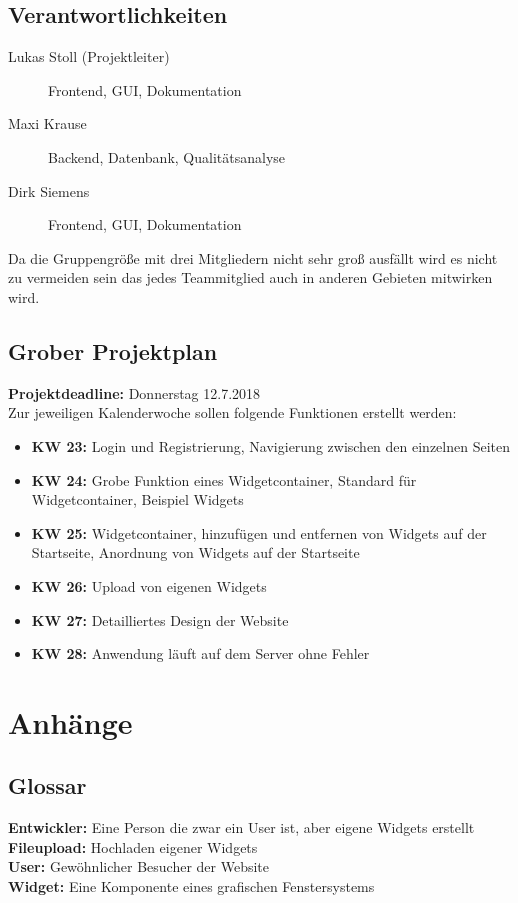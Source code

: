 	\subsection{Verantwortlichkeiten}
		\begin{description}
			\item[Lukas Stoll (Projektleiter)] Frontend, GUI, Dokumentation
			\item[Maxi Krause] Backend, Datenbank, Qualitätsanalyse
			\item[Dirk Siemens] Frontend, GUI, Dokumentation
		\end{description}
		Da die Gruppengröße mit drei Mitgliedern nicht sehr groß ausfällt wird es nicht zu vermeiden sein das jedes Teammitglied auch in anderen Gebieten mitwirken wird. 
	
	\label{meile}
	\subsection{Grober Projektplan}
		\textbf{Projektdeadline: } Donnerstag 12.7.2018 \\
		Zur jeweiligen Kalenderwoche sollen folgende Funktionen erstellt werden: 
		\begin{itemize}
			\item \textbf{KW 23: }Login und Registrierung, Navigierung zwischen den einzelnen Seiten 
			\item \textbf{KW 24: }Grobe Funktion eines Widgetcontainer, Standard für Widgetcontainer, Beispiel Widgets  
			\item \textbf{KW 25: }Widgetcontainer, hinzufügen und entfernen von Widgets auf der Startseite, Anordnung von Widgets auf der Startseite   
			\item \textbf{KW 26: }Upload von eigenen Widgets
			\item \textbf{KW 27: }Detailliertes Design der Website 
			\item \textbf{KW 28: }Anwendung läuft auf dem Server ohne Fehler
		\end{itemize}
		
		
	
\newpage
\section{Anhänge}

	\subsection{Glossar}
		\textbf{Entwickler:} Eine Person die zwar ein User ist, aber eigene Widgets erstellt\\
		\textbf{Fileupload: }Hochladen eigener Widgets\\
		\textbf{User: }Gewöhnlicher Besucher der Website\\
		\textbf{Widget: } Eine Komponente eines grafischen Fenstersystems
		 
